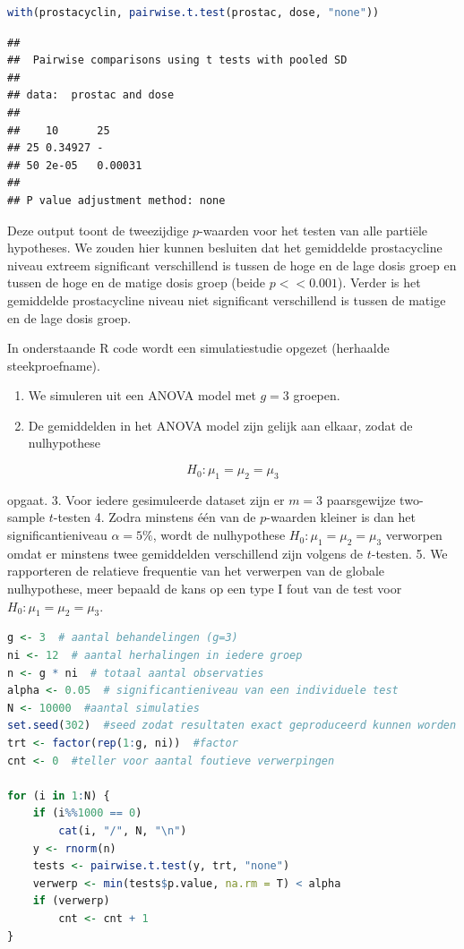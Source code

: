 \documentclass[
  12pt,dutch,coursenotes]{book}
\providecommand{\tightlist}{%
  \setlength{\itemsep}{0pt}\setlength{\parskip}{0pt}}
\begin{document}
\begin{lstlisting}[language=R]
with(prostacyclin, pairwise.t.test(prostac, dose, "none"))
\end{lstlisting}

\begin{lstlisting}
## 
##  Pairwise comparisons using t tests with pooled SD 
## 
## data:  prostac and dose 
## 
##    10      25     
## 25 0.34927 -      
## 50 2e-05   0.00031
## 
## P value adjustment method: none
\end{lstlisting}

Deze output toont de tweezijdige \(p\)-waarden voor het testen van alle partiële hypotheses.
We zouden hier kunnen besluiten dat het gemiddelde prostacycline niveau extreem significant verschillend is tussen de hoge en de lage dosis groep en tussen de hoge en de matige dosis groep (beide \(p<<0.001\)).
Verder is het gemiddelde prostacycline niveau niet significant verschillend is tussen de matige en de lage dosis groep.

In onderstaande R code wordt een simulatiestudie opgezet (herhaalde steekproefname).

\begin{enumerate}
\def\labelenumi{\arabic{enumi}.}
\tightlist
\item
  We simuleren uit een ANOVA model met \(g=3\) groepen.
\item
  De gemiddelden in het ANOVA model zijn gelijk aan elkaar, zodat de nulhypothese
\end{enumerate}

\[H_0: \mu_1=\mu_2=\mu_3\]

opgaat.
3. Voor iedere gesimuleerde dataset zijn er \(m=3\) paarsgewijze two-sample \(t\)-testen
4. Zodra minstens één van de \(p\)-waarden kleiner is dan het significantieniveau \(\alpha=5\%\), wordt de nulhypothese \(H_0: \mu_1=\mu_2=\mu_3\) verworpen omdat er minstens twee gemiddelden verschillend zijn volgens de \(t\)-testen.
5. We rapporteren de relatieve frequentie van het verwerpen van de globale nulhypothese, meer bepaald de kans op een type I fout van de test voor \(H_0: \mu_1=\mu_2=\mu_3\).

\begin{lstlisting}[language=R]
g <- 3  # aantal behandelingen (g=3)
ni <- 12  # aantal herhalingen in iedere groep
n <- g * ni  # totaal aantal observaties
alpha <- 0.05  # significantieniveau van een individuele test
N <- 10000  #aantal simulaties
set.seed(302)  #seed zodat resultaten exact geproduceerd kunnen worden
trt <- factor(rep(1:g, ni))  #factor
cnt <- 0  #teller voor aantal foutieve verwerpingen

for (i in 1:N) {
    if (i%%1000 == 0)
        cat(i, "/", N, "\n")
    y <- rnorm(n)
    tests <- pairwise.t.test(y, trt, "none")
    verwerp <- min(tests$p.value, na.rm = T) < alpha
    if (verwerp)
        cnt <- cnt + 1
}
\end{lstlisting}
\end{document}
